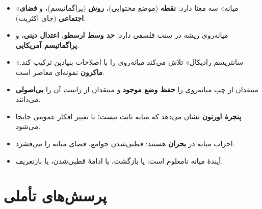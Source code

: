\begin{tcolorbox}[
    enhanced,
    colback=lightbg,
    colframe=darkgray,
    boxrule=2pt,
    arc=8pt,
    fonttitle=\bfseries\large,
    title={\rl{📝 خلاصهٔ فصل چهاردهم}}
]
\begin{itemize}
    \item «میانه» سه معنا دارد: \textbf{نقطه} (موضع محتوایی)، \textbf{روش} (پراگماتیسم)، و \textbf{فضای اجتماعی} (جای اکثریت).
    
    \item میانه‌روی ریشه در سنت فلسفی دارد: \textbf{حد وسط ارسطو}، \textbf{اعتدال دینی}، و \textbf{پراگماتیسم آمریکایی}.
    
    \item «سانتریسم رادیکال» تلاش می‌کند میانه‌روی را با اصلاحات بنیادین ترکیب کند. \textbf{ماکرون} نمونه‌ای معاصر است.
    
    \item منتقدان از چپ میانه‌روی را \textbf{حفظ وضع موجود} و منتقدان از راست آن را \textbf{بی‌اصولی} می‌دانند.
    
    \item \textbf{پنجرهٔ اورتون} نشان می‌دهد که میانه ثابت نیست؛ با تغییر افکار عمومی جابجا می‌شود.
    
    \item احزاب میانه در \textbf{بحران} هستند: قطبی‌شدن جوامع، فضای میانه را می‌فشرد.
    
    \item آیندهٔ میانه نامعلوم است: یا بازگشت، یا ادامهٔ قطبی‌شدن، یا بازتعریف.
\end{itemize}
\end{tcolorbox}

\section*{پرسش‌های تأملی}

